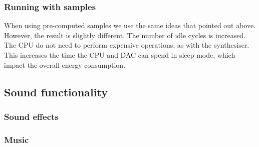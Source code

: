 \subsubsection{Running with samples}
When using pre-computed samples we use the same ideas that pointed out above. However, the result is slightly different. The number of idle cycles is increased. The CPU do not need to perform expensive operations, as with the synthesiser. This increases the time the CPU and DAC can spend in sleep mode, which impact the overall energy consumption.   





\subsection{Sound functionality}


\subsubsection{Sound effects}


\subsubsection{Music}


